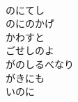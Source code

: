 \documentclass[10pt,b5j]{tarticle} %
\begin{document}
\begin{enumerate}
\begin{minipage}[c]{\blocksize}
        \vspace{\linespace}
        \item~\\
        のにてし\\
        のにのかげ\\
        かわすと\\
        ごせしのよ\\
        がのしるべなり\\
        がきにも\\
        いのに
    
    \end{minipage}
\end{enumerate} %
\end{document}
